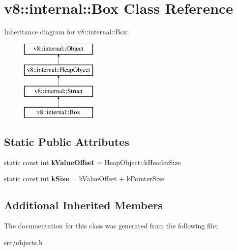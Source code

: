 \hypertarget{classv8_1_1internal_1_1_box}{}\section{v8\+:\+:internal\+:\+:Box Class Reference}
\label{classv8_1_1internal_1_1_box}
Inheritance diagram for v8\+:\+:internal\+:\+:Box\+:\begin{figure}[H]
\begin{center}
\leavevmode
\includegraphics[height=4.000000cm]{classv8_1_1internal_1_1_box}
\end{center}
\end{figure}
\subsection*{Static Public Attributes}
\begin{DoxyCompactItemize}
\item 
\hypertarget{classv8_1_1internal_1_1_box_a703da82ac4f3b707516cc087c41a45a8}{}static const int {\bfseries k\+Value\+Offset} = Heap\+Object\+::k\+Header\+Size\label{classv8_1_1internal_1_1_box_a703da82ac4f3b707516cc087c41a45a8}

\item 
\hypertarget{classv8_1_1internal_1_1_box_ad798c06e045dacc8a43dec11e06e42a6}{}static const int {\bfseries k\+Size} = k\+Value\+Offset + k\+Pointer\+Size\label{classv8_1_1internal_1_1_box_ad798c06e045dacc8a43dec11e06e42a6}

\end{DoxyCompactItemize}
\subsection*{Additional Inherited Members}


The documentation for this class was generated from the following file\+:\begin{DoxyCompactItemize}
\item 
src/objects.\+h\end{DoxyCompactItemize}
